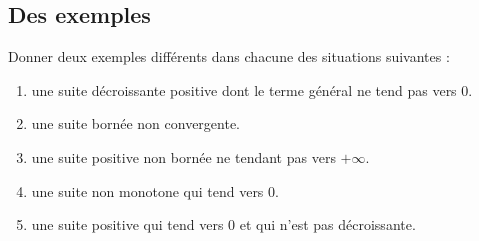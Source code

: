 
\subsection{Des exemples}
Donner deux exemples différents dans chacune des situations suivantes :
\begin{enumerate}[label = $\square$, itemsep = 0.5em]
  \item une suite décroissante positive dont le terme général ne tend pas vers 0.

  \item une suite bornée non convergente.

  \item une suite positive non bornée ne tendant pas vers $+\infty$.

  \item une suite non monotone qui tend vers 0.

  \item une suite positive qui tend vers 0 et qui n'est pas décroissante.

\end{enumerate}



